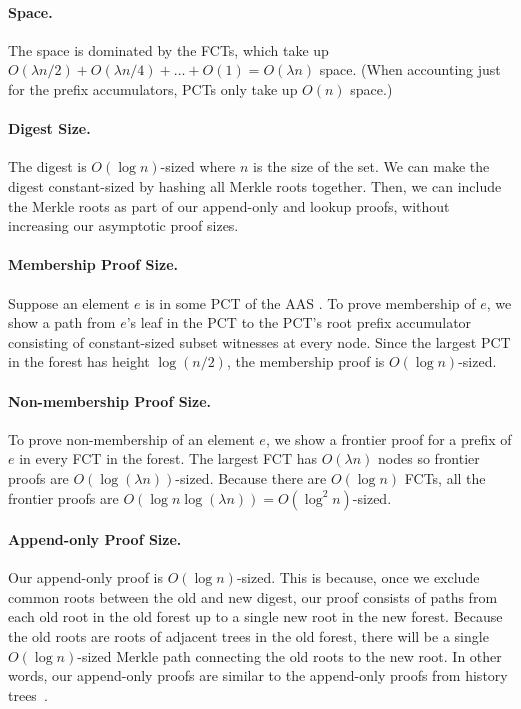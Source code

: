 \paragraph{Space.}
The space is dominated by the FCTs, which take up $O(\lambda n/2) + O(\lambda n/4) + \dots + O(1) = O(\lambda n)$ space.
(When accounting just for the prefix accumulators, PCTs only take up $O(n)$ space.)

\paragraph{Digest Size.}
The digest is $O(\log{n})$-sized where $n$ is the size of the set.
We can make the digest constant-sized by hashing all Merkle roots together.
Then, we can include the Merkle roots as part of our append-only and lookup proofs, without increasing our asymptotic proof sizes.

\paragraph{Membership Proof Size.}
Suppose an element $e$ is in some PCT of the AAS .
To prove membership of $e$, we show a path from $e$'s leaf in the PCT to the PCT's root prefix accumulator consisting of constant-sized subset witnesses at every node.
Since the largest PCT in the forest has height $\log{(n/2)}$, the membership proof is $O(\log{n})$-sized.

\paragraph{Non-membership Proof Size.}
To prove non-membership of an element $e$, we show a frontier proof for a prefix of $e$ in every FCT in the forest.
The largest FCT has $O(\lambda n)$ nodes so frontier proofs are $O(\log{(\lambda n)})$-sized.
Because there are $O(\log{n})$ FCTs, all the frontier proofs are $O(\log{n}\log{(\lambda n)}) = O(\log^2{n})$-sized.

\paragraph{Append-only Proof Size.}
Our append-only proof is $O(\log{n})$-sized.
This is because, once we exclude common roots between the old and new digest, our proof consists of paths from each old root in the old forest up to a single new root in the new forest.
Because the old roots are roots of adjacent trees in the old forest, there will be a single $O(\log{n})$-sized Merkle path connecting the old roots to the new root.
In other words, our append-only proofs are similar to the append-only proofs from history trees~\cite{ht}.

